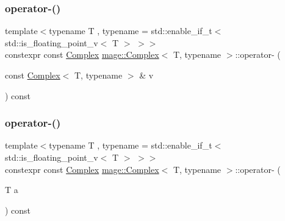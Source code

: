 \subsubsection{\texorpdfstring{operator-\/()}{operator-()}\hspace{0.1cm}{\footnotesize\ttfamily [2/3]}}
{\footnotesize\ttfamily template$<$typename T , typename  = std\+::enable\+\_\+if\+\_\+t$<$ std\+::is\+\_\+floating\+\_\+point\+\_\+v$<$ T $>$ $>$$>$ \\
constexpr const \mbox{\hyperlink{structmage_1_1_complex}{Complex}} \mbox{\hyperlink{structmage_1_1_complex}{mage\+::\+Complex}}$<$ T, typename $>$\+::operator-\/ (\begin{DoxyParamCaption}\item[{const \mbox{\hyperlink{structmage_1_1_complex}{Complex}}$<$ T, typename $>$ \&}]{v }\end{DoxyParamCaption}) const\hspace{0.3cm}{\ttfamily [noexcept]}}

\mbox{\label{structmage_1_1_complex_a98b611f0ee4781f182049cbb68306972}} 
\subsubsection{\texorpdfstring{operator-\/()}{operator-()}\hspace{0.1cm}{\footnotesize\ttfamily [3/3]}}
{\footnotesize\ttfamily template$<$typename T , typename  = std\+::enable\+\_\+if\+\_\+t$<$ std\+::is\+\_\+floating\+\_\+point\+\_\+v$<$ T $>$ $>$$>$ \\
constexpr const \mbox{\hyperlink{structmage_1_1_complex}{Complex}} \mbox{\hyperlink{structmage_1_1_complex}{mage\+::\+Complex}}$<$ T, typename $>$\+::operator-\/ (\begin{DoxyParamCaption}\item[{T}]{a }\end{DoxyParamCaption}) const\hspace{0.3cm}{\ttfamily [noexcept]}}

\mbox{\label{structmage_1_1_complex_a2a9166690c499558e677c6a049557c3b}} 
